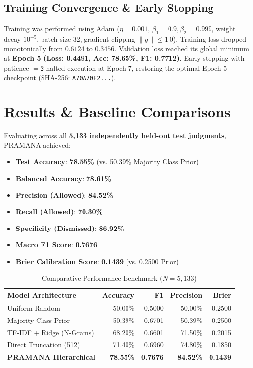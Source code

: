 \documentclass[journal,10pt,twocolumn]{IEEEtran}
\begin{document}
\subsection{Training Convergence & Early Stopping}
Training was performed using Adam ($\eta = 0.001$, $\beta_1 = 0.9, \beta_2 = 0.999$, weight decay $10^{-5}$, batch size 32, gradient clipping $\|g\| \le 1.0$).
Training loss dropped monotonically from $0.6124$ to $0.3456$. Validation loss reached its global minimum at \textbf{Epoch 5 (Loss: 0.4491, Acc: 78.65\%, F1: 0.7712)}. Early stopping with patience $= 2$ halted execution at Epoch 7, restoring the optimal Epoch 5 checkpoint (SHA-256: \texttt{A70A70F2...}).

\section{Results & Baseline Comparisons}
Evaluating across all \textbf{5,133 independently held-out test judgments}, PRAMANA achieved:
\begin{itemize}
    \item \textbf{Test Accuracy}: \textbf{78.55\%} (vs. 50.39\% Majority Class Prior)
    \item \textbf{Balanced Accuracy}: \textbf{78.61\%}
    \item \textbf{Precision (Allowed)}: \textbf{84.52\%}
    \item \textbf{Recall (Allowed)}: \textbf{70.30\%}
    \item \textbf{Specificity (Dismissed)}: \textbf{86.92\%}
    \item \textbf{Macro F1 Score}: \textbf{0.7676}
    \item \textbf{Brier Calibration Score}: \textbf{0.1439} (vs. 0.2500 Prior)
\end{itemize}

\begin{table}[t]
\caption{Comparative Performance Benchmark ($N = 5,133$)}
\label{tab:baselines}
\centering
\begin{tabularx}{\columnwidth}{lrrrr}
\toprule
\textbf{Model Architecture} & \textbf{Accuracy} & \textbf{F1} & \textbf{Precision} & \textbf{Brier} \\
\midrule
Uniform Random & 50.00\% & 0.5000 & 50.00\% & 0.2500 \\
Majority Class Prior & 50.39\% & 0.6701 & 50.39\% & 0.2500 \\
TF-IDF + Ridge (N-Grams) & 68.20\% & 0.6601 & 71.50\% & 0.2015 \\
Direct Truncation (512) & 71.40\% & 0.6960 & 74.80\% & 0.1850 \\
\textbf{PRAMANA Hierarchical} & \textbf{78.55\%} & \textbf{0.7676} & \textbf{84.52\%} & \textbf{0.1439} \\
\bottomrule
\end{tabularx}
\end{table}
\end{document}
